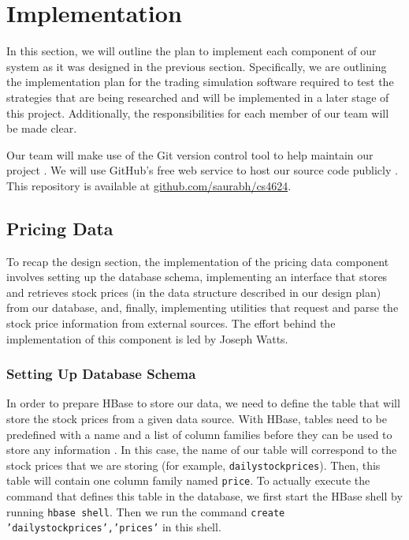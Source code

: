 
\section{Implementation}

In this section, we will outline the plan to implement each component of our system as it was designed in the previous section. Specifically, we are outlining the implementation plan for the trading simulation software required to test the strategies that are being researched and will be implemented in a later stage of this project. Additionally, the responsibilities for each member of our team will be made clear.

Our team will make use of the Git version control tool to help maintain our project \cite{git}. We will use GitHub's free web service to host our source code publicly \cite{github}. This repository is available at \url{github.com/saurabh/cs4624}.

\subsection{Pricing Data}

To recap the design section, the implementation of the pricing data component involves setting up the database schema, implementing an interface that stores and retrieves stock prices (in the data structure described in our design plan) from our database, and, finally, implementing utilities that request and parse the stock price information from external sources. The effort behind the implementation of this component is led by Joseph Watts.

\subsubsection{Setting Up Database Schema}

In order to prepare HBase to store our data, we need to define the table that will store the stock prices from a given data source. With HBase, tables need to be predefined with a name and a list of column families before they can be used to store any information \cite{hbase}. In this case, the name of our table will correspond to the stock prices that we are storing (for example, \texttt{dailystockprices}). Then, this table will contain one column family named \texttt{price}. To actually execute the command that defines this table in the database, we first start the HBase shell by running \texttt{hbase shell}. Then we run the command \texttt{create 'dailystockprices','prices'} in this shell.

